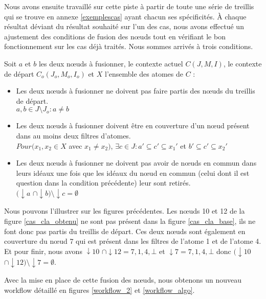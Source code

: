 Nous avons ensuite travaillé sur cette piste à partir de toute une série de treillis qui se trouve en annexe \ref{exemplescas} ayant chacun ses spécificités. À chaque résultat déviant du résultat souhaité sur l'un des cas, nous avons effectué un ajustement des conditions de fusion des n\oe uds tout en vérifiant le bon fonctionnement sur les cas déjà traités. Nous sommes arrivés à trois conditions.

\begin{definition}
Soit $a$ et $b$ les deux n\oe uds à fusionner, le contexte actuel $C(J, M, I)$, le contexte de départ $C_o(J_o, M_o, I_o)$ et $X$ l'ensemble des atomes de $C$ :
\begin{itemize}
	\item Les deux n\oe uds à fusionner ne doivent pas faire partis des n\oe uds du treillis de départ.\\
	$a, b \in J \setminus J_o : a \neq b$
	\item Les deux n\oe uds à fusionner doivent être en couverture d'un n\oe ud présent dans au moins deux filtres d'atomes.\\
	$Pour (x_1, x_2 \in X$ avec $x_1 \neq x_2)$, $\exists c \in J : a' \subseteq c' \subseteq x_1'$ et $b' \subseteq c' \subseteq x_2'$
	\item Les deux n\oe uds à fusionner ne doivent pas avoir de n\oe uds en commun dans leurs idéaux une fois que les idéaux du n\oe ud en commun (celui dont il est question dans la condition précédente) leur sont retirés.\\
	$(\downarrow \! a$ $\cap \downarrow \! b) \setminus \downarrow \! c = \emptyset$
\end{itemize}
\end{definition}

Nous pouvons l'illustrer sur les figures précédentes. Les n\oe uds 10 et 12 de la figure \ref{cas_cla_obtenu} ne sont pas présent dans la figure \ref{cas_cla_base}, ils ne font donc pas partis du treillis de départ. Ces deux n\oe uds sont également en couverture du n\oe ud 7 qui est présent dans les filtres de l'atome 1 et de l'atome 4. Et pour finir, nous avons $\downarrow \! 10$ $\cap \downarrow \! 12 = {7, 1, 4, \bot}$ et $\downarrow \! 7 = {7, 1, 4, \bot}$ donc $(\downarrow \! 10$ $\cap \downarrow \! 12) \setminus \downarrow \! 7 = \emptyset$.

\bigbreak

Avec la mise en place de cette fusion des n\oe uds, nous obtenons un nouveau workflow détaillé en figures \ref{workflow_2} et \ref{workflow_algo}.


